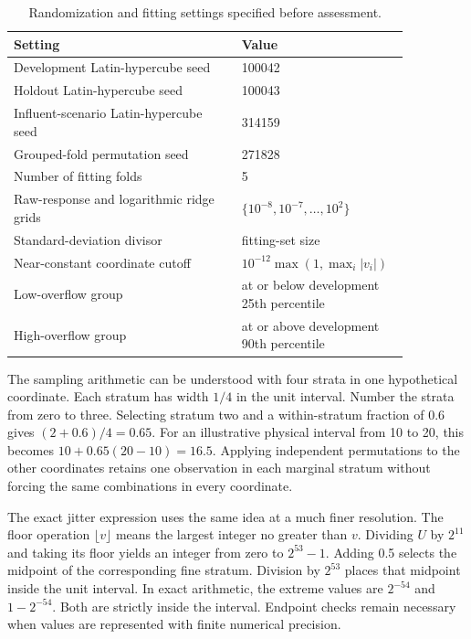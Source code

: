 \begin{table}[htbp]
\centering\small
\caption{Randomization and fitting settings specified before assessment.}
\label{tab:plant_design_settings}
\begin{tabular}{p{0.54\linewidth}p{0.32\linewidth}}
\toprule Setting & Value\\\midrule
Development Latin-hypercube seed & 100042\\
Holdout Latin-hypercube seed & 100043\\
Influent-scenario Latin-hypercube seed & 314159\\
Grouped-fold permutation seed & 271828\\
Number of fitting folds & 5\\
Raw-response and logarithmic ridge grids & $\{10^{-8},10^{-7},\ldots,10^2\}$\\
Standard-deviation divisor & fitting-set size\\
Near-constant coordinate cutoff & $10^{-12}\max(1,\max_i|v_i|)$\\
Low-overflow group & at or below development 25th percentile\\
High-overflow group & at or above development 90th percentile\\
\bottomrule
\end{tabular}
\end{table}

The sampling arithmetic can be understood with four strata in one hypothetical coordinate. Each stratum has width $1/4$ in the unit interval. Number the strata from zero to three. Selecting stratum two and a within-stratum fraction of 0.6 gives $(2+0.6)/4=0.65$. For an illustrative physical interval from 10 to 20, this becomes $10+0.65(20-10)=16.5$. Applying independent permutations to the other coordinates retains one observation in each marginal stratum without forcing the same combinations in every coordinate.

The exact jitter expression uses the same idea at a much finer resolution. The floor operation $\lfloor v\rfloor$ means the largest integer no greater than $v$. Dividing $U$ by $2^{11}$ and taking its floor yields an integer from zero to $2^{53}-1$. Adding 0.5 selects the midpoint of the corresponding fine stratum. Division by $2^{53}$ places that midpoint inside the unit interval. In exact arithmetic, the extreme values are $2^{-54}$ and $1-2^{-54}$. Both are strictly inside the interval. Endpoint checks remain necessary when values are represented with finite numerical precision.

